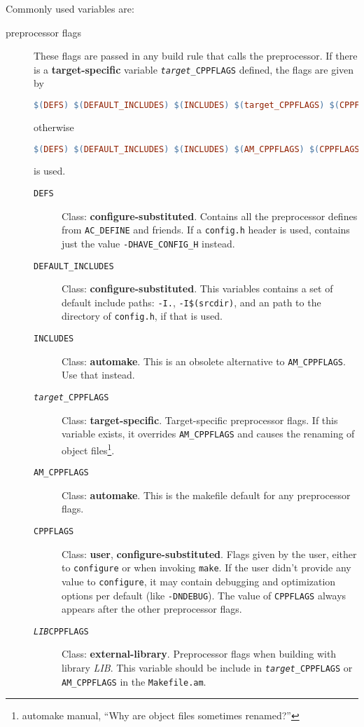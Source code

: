 \documentclass[11pt,a4paper,headinclude,footinclude,DIV16,normalheadings]{scrartcl}
\begin{document}
Commonly used variables are:
\begin{description}
\item[preprocessor flags] These flags are passed in any build rule that calls
  the preprocessor.  If there is a {\bf target-specific} variable
  \texttt{\textit{target}\_CPPFLAGS} defined, the flags are given by
\begin{lstlisting}[language=make]
$(DEFS) $(DEFAULT_INCLUDES) $(INCLUDES) $(target_CPPFLAGS) $(CPPFLAGS)
\end{lstlisting}
  otherwise
\begin{lstlisting}[language=make]
$(DEFS) $(DEFAULT_INCLUDES) $(INCLUDES) $(AM_CPPFLAGS) $(CPPFLAGS)
\end{lstlisting}
  is used.
  \begin{description}
  \item[\texttt{DEFS}] Class: {\bf configure-substituted}.  Contains all the
    preprocessor defines from \lstinline[language=sh]{AC_DEFINE} and friends.
    If a \texttt{config.h} header is used, contains just the value
    \texttt{-DHAVE\_CONFIG\_H} instead.
  \item[\texttt{DEFAULT\_INCLUDES}] Class: {\bf configure-substituted}.  This
    variables contains a set of default include paths: \texttt{-I.},
    \texttt{-I\$(srcdir)}, and an path to the directory of \texttt{config.h},
    if that is used.
  \item[\texttt{INCLUDES}] Class: {\bf automake}.  This is an obsolete
    alternative to \texttt{AM\_CPPFLAGS}.  Use that instead.
  \item[\texttt{\textit{target}\_CPPFLAGS}] Class: {\bf target-specific}.
    Target-specific preprocessor flags.  If this variable exists, it overrides
    \texttt{AM\_CPPFLAGS} and causes the renaming of object
    files\footnote{automake manual, ``Why are object files sometimes
      renamed?''}.
  \item[\texttt{AM\_CPPFLAGS}] Class: {\bf automake}.  This is the makefile
    default for any preprocessor flags.
  \item[\texttt{CPPFLAGS}] Class: {\bf user}, {\bf configure-substituted}.
    Flags given by the user, either to \texttt{configure} or when invoking
    \texttt{make}.  If the user didn't provide any value to
    \texttt{configure}, it may contain debugging and optimization options per
    default (like \texttt{-DNDEBUG}).  The value of \texttt{CPPFLAGS} always
    appears after the other preprocessor flags.
  \item[\texttt{\textit{LIB}CPPFLAGS}] Class: {\bf external-library}.
    Preprocessor flags when building with library \textit{LIB}.  This variable
    should be include in \texttt{\textit{target}\_CPPFLAGS} or
    \texttt{AM\_CPPFLAGS} in the \texttt{Makefile.am}.
  \end{description}


\end{description}
\end{document}
